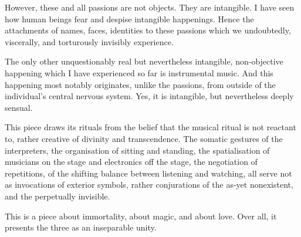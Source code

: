 \documentclass[12pt]{article}
\begin{document}
\begingroup
\hspace{4mm} However, these and all passions are not objects. They are intangible. I have seen how human beings fear and despise intangible happenings. Hence the attachments of names, faces, identities to these passions which we undoubtedly, viscerally, and torturously invisibly experience. 
\endgroup

\begingroup
\hspace{4mm} The only other unquestionably real but nevertheless intangible, non-objective happening which I have experienced so far is instrumental music. And this happening most notably originates, unlike the passions, from outside of the individual's central nervous system. Yes, it is intangible, but nevertheless deeply sensual. 
\endgroup

\begingroup
\hspace{4mm} This piece draws its rituals from the belief that the musical ritual is not reactant to, rather creative of divinity and transcendence. The somatic gestures of the interpreters, the organisation of sitting and standing, the spatialisation of musicians on the stage and electronics off the stage, the negotiation of repetitions, of the shifting balance between listening and watching, all serve not as invocations of exterior symbols, rather conjurations of the as-yet nonexistent, and the perpetually invisible. 
\endgroup

\begingroup
\hspace{4mm} This is a piece about immortality, about magic, and about love. Over all, it presents the three as an inseparable unity.
\endgroup
\end{document}
